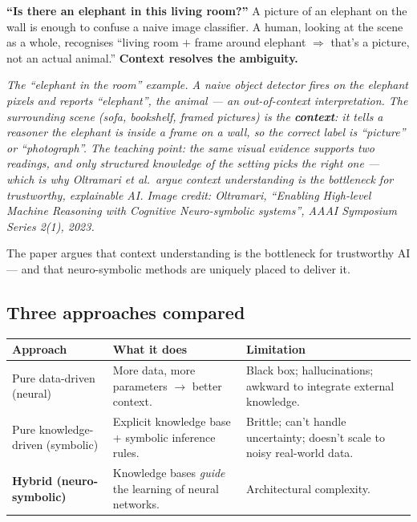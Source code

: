 \documentclass[11pt, a4paper]{article}
\newcommand{\thead}[1]{\textbf{#1}}
\begin{document}
\textbf{``Is there an elephant in this living room?''} A picture of an elephant on the wall is enough to confuse a naive image classifier. A human, looking at the scene as a whole, recognises ``living room $+$ frame around elephant $\Rightarrow$ that's a picture, not an actual animal.'' \textbf{Context resolves the ambiguity.}

\begin{center}

\footnotesize\textit{The ``elephant in the room'' example. A naive object detector fires on the elephant pixels and reports ``elephant'', the animal --- an out-of-context interpretation. The surrounding scene (sofa, bookshelf, framed pictures) is the \textbf{context}: it tells a reasoner the elephant is inside a frame on a wall, so the correct label is ``picture'' or ``photograph''. The teaching point: the same visual evidence supports two readings, and only structured knowledge of the setting picks the right one --- which is why Oltramari et al.\ argue context understanding is the bottleneck for trustworthy, explainable AI. Image credit: Oltramari, ``Enabling High-level Machine Reasoning with Cognitive Neuro-symbolic systems'', AAAI Symposium Series 2(1), 2023.}
\end{center}

The paper argues that context understanding is the bottleneck for trustworthy AI — and that neuro-symbolic methods are uniquely placed to deliver it.

\subsection{Three approaches compared}

\begin{center}
\renewcommand{\arraystretch}{1.25}
\begin{tabular}{@{}p{3.5cm}p{5.5cm}p{5cm}@{}}
\toprule
\thead{Approach} & \thead{What it does} & \thead{Limitation} \\
\midrule
Pure data-driven (neural)    & More data, more parameters $\to$ better context. & Black box; hallucinations; awkward to integrate external knowledge. \\
Pure knowledge-driven (symbolic) & Explicit knowledge base + symbolic inference rules. & Brittle; can't handle uncertainty; doesn't scale to noisy real-world data. \\
\textbf{Hybrid (neuro-symbolic)} & Knowledge bases \emph{guide} the learning of neural networks. & Architectural complexity. \\
\bottomrule
\end{tabular}
\end{center}
\end{document}
